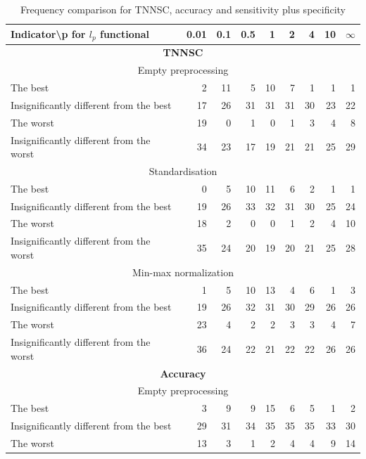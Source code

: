\documentclass[entropy,article,submit,moreauthors,pdftex]{Definitions/mdpi}
\begin{document}
\begin{table}[tb]
\caption{Frequency comparison for TNNSC, accuracy and sensitivity plus specificity}
\centering
\begin{tabular}{|l|r|r|r|r|r|r|r|r|}
\hline
\textbf{Indicator\textbackslash p for $l_p$ functional}&\textbf{0.01}&\textbf{0.1}&\textbf{0.5}&\textbf{1}&\textbf{2}&\textbf{4}&\textbf{10}&$\infty$\\
\hline
\multicolumn{9}{|c|}{\textbf{TNNSC}}\\ \hline
\multicolumn{9}{|c|}{Empty preprocessing}\\ \hline
The best & 2 & 11 & 5 & 10 & 7 & 1 & 1 & 1\\ \hline
Insignificantly different from the best & 17 & 26 & 31 & 31 & 31 & 30 & 23 & 22\\ \hline
The worst & 19 & 0 & 1 & 0 & 1 & 3 & 4 & 8\\ \hline
Insignificantly different from the worst & 34 & 23 & 17 & 19 & 21 & 21 & 25 & 29\\ \hline
\multicolumn{9}{|c|}{Standardisation}\\ \hline
The best & 0 & 5 & 10 & 11 & 6 & 2 & 1 & 1\\ \hline
Insignificantly different from the best & 19 & 26 & 33 & 32 & 31 & 30 & 25 & 24\\ \hline
The worst & 18 & 2 & 0 & 0 & 1 & 2 & 4 & 10\\ \hline
Insignificantly different from the worst & 35 & 24 & 20 & 19 & 20 & 21 & 25 & 28\\ \hline
\multicolumn{9}{|c|}{Min-max normalization}\\ \hline
The best & 1 & 5 & 10 & 13 & 4 & 6 & 1 & 3\\ \hline
Insignificantly different from the best & 19 & 26 & 32 & 31 & 30 & 29 & 26 & 26\\ \hline
The worst & 23 & 4 & 2 & 2 & 3 & 3 & 4 & 7\\ \hline
Insignificantly different from the worst & 36 & 24 & 22 & 21 & 22 & 22 & 26 & 26\\ \hline
\multicolumn{9}{|c|}{\textbf{Accuracy}}\\ \hline
\multicolumn{9}{|c|}{Empty preprocessing}\\ \hline
The best & 3 & 9 & 9 & 15 & 6 & 5 & 1 & 2\\ \hline
Insignificantly different from the best & 29 & 31 & 34 & 35 & 35 & 35 & 33 & 30\\ \hline
The worst & 13 & 3 & 1 & 2 & 4 & 4 & 9 & 14\\ \hline

\end{tabular}
\end{table}
\end{document}
